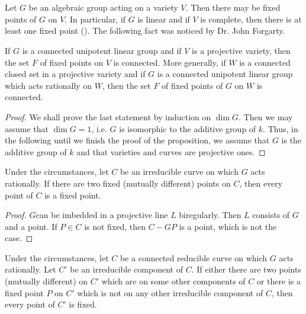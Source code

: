 \section{}\label{art16-sec3}
Let $G$ be an algebraic group acting on a variety $V$. Then there may be fixed points of $G$ on $V$. In particular, if $G$ is linear and if $V$ is complete, then there is at least one fixed point (\cite{art16-key-B}). The following fact was noticed by Dr. John Forgarty.

\begin{proposition}\label{art16-prop3.1}
If $G$ is a connected unipotent linear group and if $V$ is a projective variety, then the set $F$ of fixed points on $V$ is connected. More generally, if $W$ is a connected closed set in a projective variety and if $G$ is a connected unipotent linear group which acts rationally on $W$, then the set $F$ of fixed points of $G$ on $W$ is connected.
\end{proposition}

\begin{proof}
We shall prove the last statement by induction on $\dim G$. Then we may assume that $\dim G=1$, i.e. $G$ is isomorphic to the additive group of $k$. Thus, in the following until we finish the proof of the proposition, we assume that $G$ is the additive group of $k$ and that varieties and curves are projective ones.
\end{proof}

\begin{lemma}\label{art16-lem3.2}
Under the circumstances, let $C$ be an irreducible curve on which $G$ acts rationally. If there are two fixed (mutually different) points on $C$, then every point of $C$ is a fixed point.
\end{lemma}

\begin{proof}
$G$\pageoriginale can be imbedded in a projective line $L$ biregularly. Then $L$ consists of $G$ and a point. If $P\in C$ is not fixed, then $C-GP$ is a point, which is not the case.
\end{proof}

\begin{corollary}\label{art16-coro3.3}
Under the circumstances, let $C$ be a connected reducible curve on which $G$ acts rationally. Let $C'$ be an irreducible component of $C$. If either there are two points (mutually different) on $C'$ which are on some other components of $C$ or there is a fixed point $P$ on $C'$ which is not on any other irreducible component of $C$, then every point of $C'$ is fixed.
\end{corollary}

